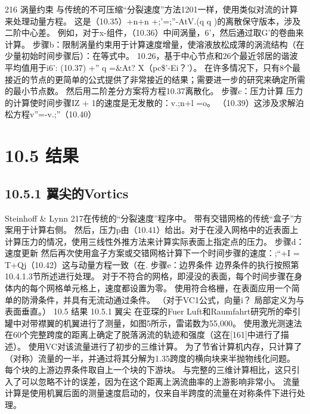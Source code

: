 \documentclass[UTF8,11pt,a4paper,openany,fontset=fandol]{ctexbook}
\begin{document}
216 涡量约束 与传统的不可压缩“分裂速度”方法1201一样，使用类似对流的计算来处理动量方程。 这是（10.35）+n+n +;'=;”-AtV.(q q )的离散保守版本，涉及二阶中心差。 例如，对于x-组件，（10.36）中间涡量，6'，然后通过取G'的卷曲来计算。 步骤b：限制涡量约束用于计算速度增量，使溶液放松成薄的涡流结构（在少量初始时间步骤后）：在等式中。 10.26，基于中心节点和26个最近邻居的谐波平均值用于i6': (10.37) +” q =\&At? X（pc\$'-Ei？'）。 在许多情况下，只有8个最接近的节点的更简单的公式提供了非常接近的结果；需要进一步的研究来确定所需的最小节点数。 然后用二阶差分方案将方程10.37离散化。 步骤c：压力计算 压力的计算使时间步骤IZ + 1的速度是无发散的：v.;n+l =o。 （10.39）这涉及求解泊松方程v”=-v.;”（10.40）

\section{10.5 结果}
\subsection{10.5.1 翼尖的Vortics}
Steinhoff \& Lynn 217在传统的“分裂速度”程序中。 带有交错网格的传统“盒子”方案用于计算右侧。 然后，压力p由（10.41）给出。对于在浸入网格中的近表面上计算压力的情况，使用三线性外推方法来计算实际表面上指定点的压力。 步骤d：速度更新 然后再次使用盒子方案或交错网格计算下一个时间步骤的速度：;“+I = T+Qj（10.42）这与动量方程一致（在. 步骤e：边界条件 边界条件的执行按照第10.4.1.3节所述进行处理。 对于不符合的网格，即浸没的表面，每个时间步骤在身体内的每个网格单元格上，速度都设置为零。 使用符合格栅，在表面应用一个简单的防滑条件，并具有无流动通过条件。 （对于VC1公式，向量i？ 局部定义为与表面垂直。） 10.5 结果 10.5.1 翼尖 在亚琛的Fuer Luft和Raumfahrt研究所的牵引罐中对带襟翼的机翼进行了测量，如图5所示，雷诺数为55,000。 使用激光测速法在60个完整跨度的距离上确定了脱落涡流的轨迹和强度（这在[161]中进行了描述）。 使用VC对该流量进行了初步的三维计算。 为了节省计算机内存，只计算了（对称）流量的一半，并通过将其分解为1.35跨度的横向块来半抛物线化问题。 每个块的上游边界条件取自上一个块的下游块。 与完整的三维计算相比，这只引入了可以忽略不计的误差，因为在这个距离上涡流曲率的上游影响非常小。 流量计算是使用机翼后面的测量速度启动的，仅来自半跨度的流量在对称条件下进行处理。
\end{document}

